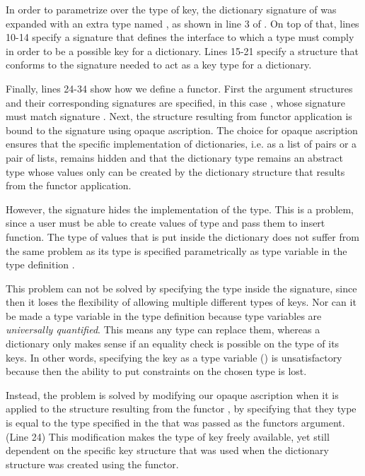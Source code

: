 In order to parametrize over the type of key, the dictionary signature of  was expanded with an extra type named , as shown in line 3 of .
On top of that, lines 10-14 specify a signature  that defines the interface to which a type must comply in order to be a possible key for a dictionary.
Lines 15-21 specify a structure  that conforms to the signature needed to act as a key type for a dictionary.

Finally, lines 24-34 show how we define a functor.
First the argument structures and their corresponding signatures are specified, in this case , whose signature must match signature .
Next, the structure resulting from functor application is bound to the  signature using opaque ascription.
The choice for opaque ascription ensures that the specific implementation of dictionaries, i.e. as a list of pairs or a pair of lists, remains hidden and that the dictionary type remains an abstract type whose values only can be created by the dictionary structure that results from the functor application.

However, the signature  hides the implementation of the  type.
This is a problem, since a user must be able to create values of type  and pass them to insert function.
The type of values that is put inside the dictionary does not suffer from the same problem as its type is specified parametrically as type variable  in the type definition .

This problem can not be solved by specifying the type inside the  signature, since then it loses the flexibility of allowing multiple different types of keys.
Nor can it be made a type variable in the type definition  because type variables are \emph{universally quantified}. 
This means any type can replace them, whereas a dictionary only makes sense if an equality check is possible on the type of its keys.
In other words, specifying the key as a type variable () is unsatisfactory because then the ability to put constraints on the chosen type is lost.

Instead, the problem is solved by modifying our opaque ascription when it is applied to the structure resulting from the functor , by specifying that they  type is equal to the type  specified in the  that was passed as the functors argument. (Line 24)
This modification makes the type of key freely available, yet still dependent on the specific key structure that was used when the dictionary structure was created using the functor.

